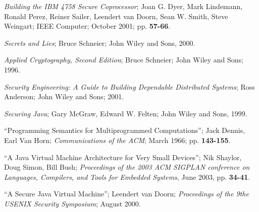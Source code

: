 \documentclass{llncs}
\begin{document}
\begin{thebibliography}{99}
\emph{Building the IBM 4758 Secure Coprocessor};
Joan G. Dyer, Mark Lindemann, Ronald Perez, Reiner Sailer, Leendert van Doorn, Sean W. Smith, Steve Weingart;
IEEE Computer;
October 2001; pp. {\bf 57-66}.

\emph{Secrets and Lies};
Bruce Schneier;
John Wiley and Sons, 2000.

\emph{Applied Cryptography, Second Edition};
Bruce Schneier;
John Wiley and Sons; 1996.

\emph{Security Engineering: A Guide to Building Dependable Distributed Systems};
Ross Anderson;
John Wiley and Sons; 2001.

\emph{Securing Java};
Gary McGraw, Edward W. Felten;
John Wiley and Sons, 1999.

``Programming Semantics for Multiprogrammed Computations'';
Jack Dennis, Earl Van Horn;
\emph{Communications of the ACM};
March 1966; pp. {\bf 143-155}.

``A Java Virtual Machine Architecture for Very Small Devices'';
Nik Shaylor, Doug Simon, Bill Bush;
\emph{Proceedings of the 2003 ACM SIGPLAN conference on Languages, Compilers, and Tools for Embedded Systems}, June 2003, pp. {\bf 34-41}.

``A Secure Java Virtual Machine'';
Leendert van Doorn;
\emph{Proceedings of the 9the USENIX Security Symposium};
August 2000.

\end{thebibliography}
\end{document}
